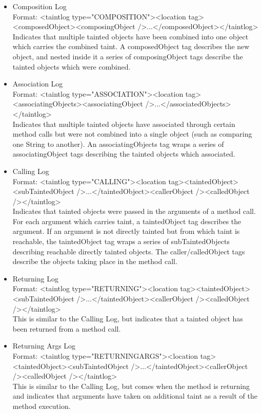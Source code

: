 \documentclass[msc,oneside]{ubcthesis}
\begin{document}
\begin{itemize}
\item Composition Log \\
Format: <taintlog type="COMPOSITION"><location tag><composedObject><composingObject />...</composedObject></taintlog> \\
Indicates that multiple tainted objects have been combined into one object which carries the combined taint. A composedObject tag describes the new object, and nested inside it a series of composingObject tags describe the tainted objects which were combined.

\item Association Log \\
Format: <taintlog type="ASSOCIATION"><location tag><associatingObjects><associatingObject />...</associatedObjects></taintlog> \\
Indicates that multiple tainted objects have associated through certain method calls but were not combined into a single object (such as comparing one String to another). An associatingObjects tag wraps a series of associatingObject tags describing the tainted objects which associated.

\item Calling Log \\ 
Format: <taintlog type="CALLING"><location tag><taintedObject><subTaintedObject />...</taintedObject><callerObject /><calledObject /></taintlog> \\
Indicates that tainted objects were passed in the arguments of a method call. For each argument which carries taint, a taintedObject tag describes the argument. If an argument is not directly tainted but from which taint is reachable, the taintedObject tag wraps a series of subTaintedObjects describing reachable directly tainted objects. The caller/calledObject tags describe the objects taking place in the method call.

\item Returning Log \\ 
Format: <taintlog type="RETURNING"><location tag><taintedObject><subTaintedObject />...</taintedObject><callerObject /><calledObject /></taintlog> \\
This is similar to the Calling Log, but indicates that a tainted object has been returned from a method call.

\item Returning Args Log \\ 
Format: <taintlog type="RETURNINGARGS"><location tag><taintedObject><subTaintedObject />...</taintedObject><callerObject /><calledObject /></taintlog> \\
This is similar to the Calling Log, but comes when the method is returning and indicates that arguments have taken on additional taint as a result of the method execution.


\end{itemize}
\end{document}
